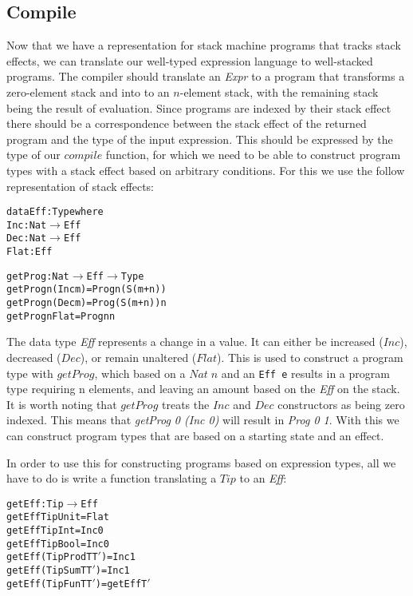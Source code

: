 \subsection{Compile}
Now that we have a representation for stack machine programs that tracks stack effects, we can translate our well-typed expression language to well-stacked programs. The compiler should translate an \textit{Expr} to a program that transforms a zero-element stack and into to an $n$-element stack, with the remaining stack being the result of evaluation. Since programs are indexed by their stack effect there should be a correspondence between the stack effect of the returned program and the type of the input expression. This should be expressed by the type of our $compile$ function, for which we need to be able to construct program types with a stack effect based on arbitrary  conditions. For this we use the follow representation of stack effects:

\begin{alltt}
data Eff : Type where
	Inc  : Nat \(\rightarrow\)  Eff
	Dec  : Nat \(\rightarrow\)  Eff
	Flat :        Eff

getProg : Nat \(\rightarrow\)  Eff \(\rightarrow\)  Type
getProg n (Inc m) = Prog n (S (m + n))
getProg n (Dec m) = Prog (S (m + n)) n
getProg n Flat    = Prog n n
\end{alltt}

The data type \textit{Eff} represents a change in a value. It can either be increased ($Inc$), decreased ($Dec$), or remain unaltered ($Flat$). This is used to construct a program type with $getProg$, which based on a $Nat\;n$ and an \texttt{Eff e} results in a program type requiring n elements, and leaving an amount based on the \textit{Eff} on the stack. It is worth noting that $getProg$ treats the $Inc$ and $Dec$ constructors as being zero indexed. This means that \textit{getProg 0 (Inc 0)} will result in \textit{Prog 0 1}. With this we can construct program types that are based on a starting state and an effect.

In order to use this for constructing programs based on expression types, all we have to do is write a function translating a $Tip$ to an \textit{Eff}:

\begin{alltt}
getEff : Tip \(\rightarrow\) Eff
getEff TipUnit        = Flat
getEff TipInt         = Inc 0
getEff TipBool        = Inc 0
getEff (TipProd T T\('\)) = Inc 1
getEff (TipSum T T\('\))  = Inc 1
getEff (TipFun T T\('\))  = getEff T\('\)
\end{alltt}

